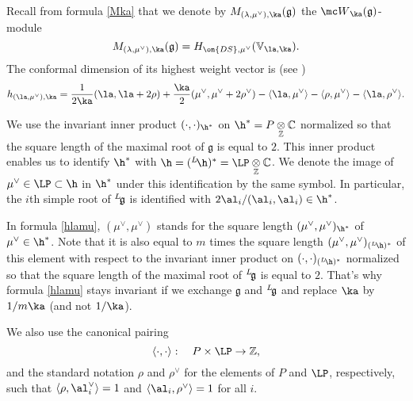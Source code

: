 \documentclass[11pt,reqno]{amsart}
\theoremstyle{plain}
\numberwithin{equation}{section}
\newcommand{\C}{\mathbb{C}}
\newcommand{\Z}{\mathbb{Z}}
\newcommand{\g}{\mathfrak{g}}
\def\neg{\negthinspace}
\def\lg{{}^L\neg\g}
\theoremstyle{definition}
\begin{document}
Recall from formula \eqref{Mka} that we denote by
$M_{(\lambda,\mu^\vee),\ka}(\g)$ the ${\mc W}_\ka(\g)$-module
$$
M_{(\lambda,\mu^\vee),\ka}(\g) = H_{\on{DS},\mu^\vee}({\mathbb
  V}_{\la,\ka}).
$$
The conformal dimension of its highest weight vector is (see
\cite{FF})
\begin{equation}    \label{hlamu}
h_{(\la,\mu^\vee),\ka} = \frac{1}{2\ka}(\la,\la+2\rho) +
\frac{\ka}{2}(\mu^\vee,\mu^\vee+2\rho^\vee)- \langle \la,\mu^\vee
\rangle - \langle \rho,\mu^\vee \rangle - \langle \la,\rho^\vee
\rangle.
\end{equation}

We use the invariant inner product $(\cdot,\cdot)_{\h^*}$ on $\h^* = P
\underset{\Z}\otimes \C$ normalized so that the square length of the
maximal root of $\g$ is equal to $2$. This inner product enables us to
identify $\h^*$ with $\h = ({}^L\neg\h)^* = \LP \underset{\Z}\otimes
\C$. We denote the image of $\mu^\vee \in \LP \subset \h$ in $\h^*$
under this identification by the same symbol. In particular, the $i$th
simple root of $\lg$ is identified with $2\al_i/(\al_i,\al_i) \in
\h^*$.

In formula \eqref{hlamu}, $(\mu^\vee,\mu^\vee)$ stands for the square
length $(\mu^\vee,\mu^\vee)_{\h^*}$ of $\mu^\vee \in \h^*$. Note that
it is also equal to $m$ times the square length
$(\mu^\vee,\mu^\vee)_{({}^L\neg\h)^*}$ of this element with respect to
the invariant inner product on $(\cdot,\cdot)_{({}^L\neg\h)^*}$
normalized so that the square length of the maximal root of $\lg$ is
equal to $2$. That's why formula \eqref{hlamu} stays invariant if we
exchange $\g$ and $\lg$ and replace $\ka$ by $1/m\ka$ (and not
$1/\ka$).

We also use the canonical pairing
$$
\langle \cdot,\cdot \rangle: \quad P \times \LP \to \Z,
$$
and the standard notation $\rho$ and $\rho^\vee$ for the elements of
$P$ and $\LP$, respectively, such that $\langle \rho,\al_i^\vee
\rangle = 1$ and $\langle \al_i,\rho^\vee \rangle =1$ for all $i$.
\end{document}
